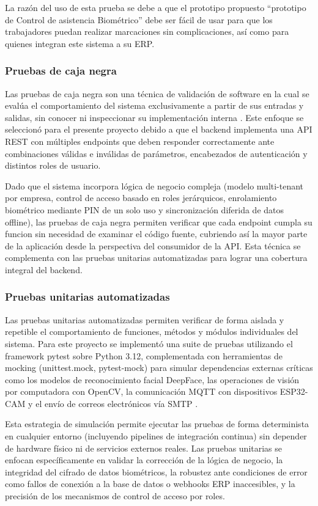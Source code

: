 \documentclass{iccmemoria}
\begin{document}
La razón del uso de esta prueba se debe a que el prototipo propuesto ``prototipo de Control de asistencia Biométrico'' debe ser fácil de usar para que los trabajadores puedan realizar marcaciones sin complicaciones, así como para quienes integran este sistema a su ERP.

\subsubsection{Pruebas de caja negra}
Las pruebas de caja negra son una técnica de validación de software en la cual se evalúa el comportamiento del sistema exclusivamente a partir de sus entradas y salidas, sin conocer ni inspeccionar su implementación interna \cite{pressman2015}. Este enfoque se seleccionó para el presente proyecto debido a que el backend implementa una API REST con múltiples endpoints que deben responder correctamente ante combinaciones válidas e inválidas de parámetros, encabezados de autenticación y distintos roles de usuario. 

Dado que el sistema incorpora lógica de negocio compleja (modelo multi-tenant por empresa, control de acceso basado en roles jerárquicos, enrolamiento biométrico mediante PIN de un solo uso y sincronización diferida de datos offline), las pruebas de caja negra permiten verificar que cada endpoint cumpla su funcion sin necesidad de examinar el código fuente, cubriendo así la mayor parte de la aplicación desde la perspectiva del consumidor de la API. Esta técnica se complementa con las pruebas unitarias automatizadas para lograr una cobertura integral del backend.

\subsubsection{Pruebas unitarias automatizadas}
Las pruebas unitarias automatizadas permiten verificar de forma aislada y repetible el comportamiento de funciones, métodos y módulos individuales del sistema. Para este proyecto se implementó una suite de pruebas utilizando el framework pytest sobre Python 3.12, complementada con herramientas de mocking (unittest.mock, pytest-mock) para simular dependencias externas críticas como los modelos de reconocimiento facial DeepFace, las operaciones de visión por computadora con OpenCV, la comunicación MQTT con dispositivos ESP32-CAM y el envío de correos electrónicos vía SMTP \cite{okken2021}. 

Esta estrategia de simulación permite ejecutar las pruebas de forma determinista en cualquier entorno (incluyendo pipelines de integración continua) sin depender de hardware físico ni de servicios externos reales. Las pruebas unitarias se enfocan específicamente en validar la corrección de la lógica de negocio, la integridad del cifrado de datos biométricos, la robustez ante condiciones de error como fallos de conexión a la base de datos o webhooks ERP inaccesibles, y la precisión de los mecanismos de control de acceso por roles.
\end{document}
